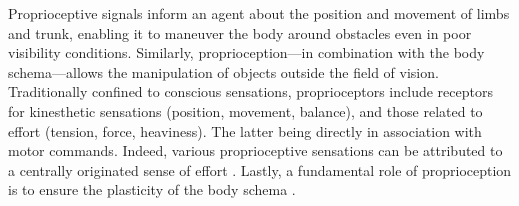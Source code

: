 Proprioceptive signals inform an agent about the position and movement of limbs and trunk, enabling it to maneuver the body around obstacles even in poor visibility conditions. Similarly, proprioception---in combination with the body schema---allows the manipulation of objects outside the field of vision. Traditionally confined to conscious sensations, proprioceptors include receptors for kinesthetic sensations (position, movement, balance), and those related to effort (tension, force, heaviness). The latter being directly in association  with motor commands. Indeed, various proprioceptive sensations can be attributed to a centrally originated sense of effort \cite{Proske2012proprioceptivesensestheir}. Lastly, a fundamental role of proprioception is to ensure the plasticity of the body schema \cite{Cardinali2016Proprioceptionisnecessary}.

